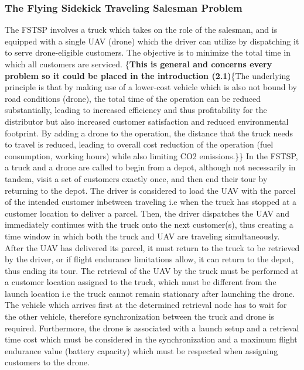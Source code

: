 \documentclass{article}
\begin{document}
	\subsubsection{The Flying Sidekick Traveling Salesman Problem} 
	The FSTSP involves a  truck which takes on the role of the salesman, and is equipped with a single UAV (drone) which the driver can utilize by dispatching it to serve drone-eligible customers. The objective is to minimize the total time in which all customers are serviced. \{\textbf{This is general and concerns every problem so it could be placed in the introduction (2.1)}\{The underlying principle is that by making use of a lower-cost vehicle which is also not bound by road conditions (drone), the total time of the operation can be reduced substantially, leading to increased efficiency and thus profitability for the distributor but also increased customer satisfaction and reduced environmental footprint. By adding a drone to the operation, the distance that the truck needs to travel is reduced, leading to overall cost reduction of the operation (fuel consumption, working hours) while also limiting CO2 emissions.\}\}
	In the FSTSP, a truck and a drone are called to begin from a depot, although not necessarily in tandem, visit a set of customers exactly once, and then end their tour by returning to the depot. The driver is considered to load the UAV with the parcel of the intended customer inbetween traveling i.e when the truck has stopped at a customer location to deliver a parcel. Then, the driver dispatches the UAV and immediately continues with the truck onto the next customer(s), thus creating a time window in which both the truck and UAV are traveling simultaneously. After the UAV has delivered its parcel, it must return to the truck to be retrieved by the driver, or if flight endurance limitations allow, it can return to the depot, thus ending its tour. The retrieval of the UAV by the truck must be performed at a customer location assigned to the truck, which must be different from the launch location i.e the truck cannot remain stationary after launching the drone. The vehicle which arrives first at the determined retrieval node has to wait for the other vehicle, therefore synchronization between the truck and drone is required. Furthermore, the drone is associated with a launch setup and a retrieval time cost which must be considered in the synchronization and a maximum flight endurance value (battery capacity) which must be respected when assigning customers to the drone.
	\par
\end{document}
